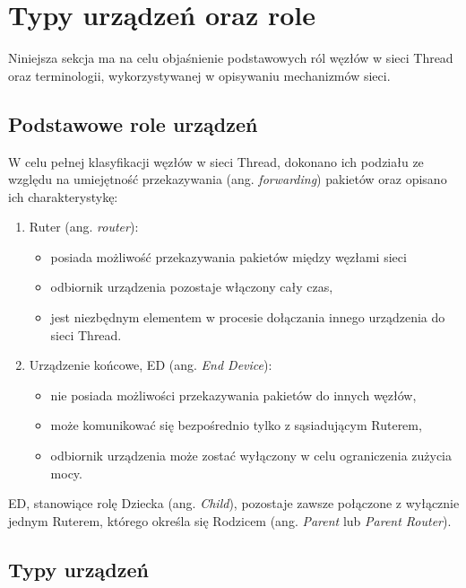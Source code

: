 \section{Typy urządzeń oraz role}
\label{sec:device-types}

    Niniejsza sekcja ma na celu objaśnienie podstawowych ról węzłów w sieci Thread oraz terminologii, wykorzystywanej w opisywaniu mechanizmów sieci.

    \subsection{Podstawowe role urządzeń}

    W celu pełnej klasyfikacji węzłów w sieci Thread, dokonano ich podziału ze względu na umiejętność przekazywania (ang. \textit{forwarding}) pakietów oraz opisano ich charakterystykę:
    \begin{enumerate}
        \item Ruter (ang. \textit{router}):
        \begin{itemize}
            \item posiada możliwość przekazywania pakietów między węzłami sieci
            \item odbiornik urządzenia pozostaje włączony cały czas,
            \item jest niezbędnym elementem w procesie dołączania innego urządzenia do sieci Thread.
        \end{itemize}
        \item Urządzenie końcowe, ED (ang. \textit{End Device}):
        \begin{itemize}
            \item nie posiada możliwości przekazywania pakietów do innych węzłów,
            \item może komunikować się bezpośrednio tylko z sąsiadującym Ruterem,
            \item odbiornik urządzenia może zostać wyłączony w celu ograniczenia zużycia mocy.
        \end{itemize}
    \end{enumerate}

    ED, stanowiące rolę Dziecka (ang. \textit{Child}), pozostaje zawsze połączone z wyłącznie jednym Ruterem, którego określa się Rodzicem (ang. \textit{Parent} lub \textit{Parent Router}).

    \subsection{Typy urządzeń}


